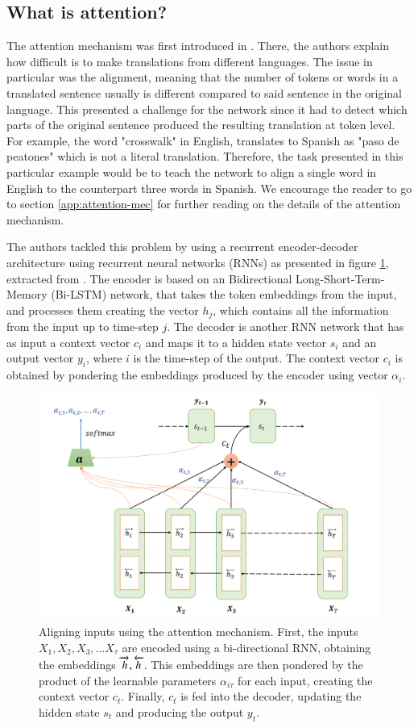 \subsection{What is attention?}
\label{sec:whats-attention}
The attention mechanism was first introduced in \cite{bahdanau2016neural}. There, the authors explain how difficult is to make translations from different languages. The issue in particular was the alignment, meaning that the number of tokens or words in a translated sentence usually is different compared to said sentence in the original language. This presented a challenge for the network since it had to detect which parts of the original sentence produced the resulting translation at token level. For example, the word "crosswalk" in English, translates to Spanish as "paso de peatones" which is not a literal translation. Therefore, the task presented in this particular example would be to teach the network to align a single word in English to the counterpart three words in Spanish. We encourage the reader to go to section \ref{app:attention-mec} for further reading on the details of the attention mechanism.

The authors tackled this problem by using a recurrent encoder-decoder architecture using recurrent neural networks (RNNs) as presented in figure \ref{fig:alignmentattention}, extracted from \cite{understandingattentionmechanism}. The encoder is based on an Bidirectional Long-Short-Term-Memory (Bi-LSTM) network, that takes the token embeddings from the input, and processes them creating the vector $h_j$, which contains all the information from the input up to time-step $j$. The decoder is another RNN network that has as input a context vector $c_i$ and maps it to a hidden state vector $s_i$ and an output vector $y_i$, where $i$ is the time-step of the output. The context vector $c_i$ is obtained by pondering the embeddings produced by the encoder using vector $\alpha_i$. 

\begin{figure}[!h]
	\centering
	\includegraphics[width=0.7\linewidth]{figures/alignment_attention}
	\caption{Aligning inputs using the attention mechanism. First, the inputs $X_1, X_2, X_3, ... X_{\tau}$ are encoded using a bi-directional RNN, obtaining the embeddings $\protect\overrightarrow{h} , \protect\overleftarrow{h}$. This embeddings are then pondered by the product of the learnable parameters $\alpha_{i \tau}$ for each input, creating the context vector $c_t$. Finally, $c_t$ is fed into the decoder, updating the hidden state $s_t$ and producing the output $y_t$.}
	\label{fig:alignmentattention}
\end{figure}


